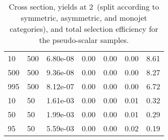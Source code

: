 \begin{table}
\begin{tabular}{lllllll}
10        &   500       &   6.80e-08  &   0.00      &   0.00      &   0.00      &   8.61      \\ 
500       &   500       &   9.36e-08  &   0.00      &   0.00      &   0.00      &   8.27      \\ 
995       &   500       &   8.12e-07  &   0.00      &   0.00      &   0.00      &   6.72      \\ 
10        &   50        &   1.61e-03  &   0.00      &   0.00      &   0.01      &   0.32      \\ 
50        &   50        &   1.99e-03  &   0.00      &   0.00      &   0.01      &   0.29      \\ 
95        &   50        &   5.59e-03  &   0.00      &   0.00      &   0.02      &   0.19      \\ 
\hline
\end{tabular}
\caption{Cross section, yields at 2~\ifb (split according to symmetric, asymmetric, and monojet categories), and total selection efficiency for the pseudo-scalar \DMtt samples.}
\label{tab:dm_DMttP_g1_2fb}
\end{table}
